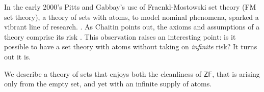 \documentclass[12pt]{llncs}
\begin{document}
\lstset{language=[Objective]Caml,frame=shadowbox}




In the early 2000's Pitts and Gabbay's use of Fraenkl-Mostowski set
theory (FM set theory), a theory of sets with atoms, to model nominal phenomena,
sparked a vibrant line of research. \cite{DBLP:journals/fac/GabbayP02}
\cite{DBLP:journals/jcss/Clouston14}. As Chaitin points out, the
axioms and assumptions of a theory comprise its risk
\cite{chaitin1999unknowable}. This observation raises an interesting
point: is it possible to have a set theory with atoms without taking
on \emph{infinite} risk? It turns out it is.

We describe a theory of sets that enjoys both the cleanliness of
$\mathsf{ZF}$, that is arising only from the empty set, and yet with
an infinite supply of atoms.













   

\end{document}
